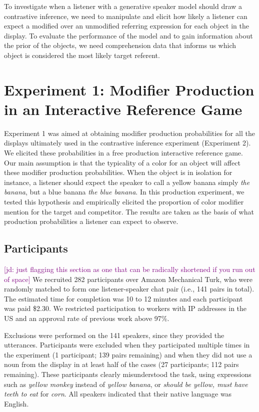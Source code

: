 \documentclass[10pt,letterpaper]{article}
\newcommand{\jd}[1]{\textcolor{Purple}{[jd: #1]}}
\begin{document}
To investigate when a listener with a generative speaker model should draw a contrastive inference, we need to manipulate and elicit how likely a listener can expect a modified over an unmodified referring expression for each object in the display. To evaluate the performance of the model and to gain information about the prior of the objects, we need comprehension data that informs us which object is considered the most likely target referent.


\section{Experiment 1: Modifier Production in an Interactive Reference Game}

Experiment 1 was aimed at obtaining modifier production probabilities for all the displays ultimately used in the contrastive inference  experiment (Experiment 2). We elicited these probabilities in a free production interactive reference game. Our main assumption is that the typicality of a color for an object will affect these modifier production probabilities. When the object is in isolation for instance, a listener should expect the speaker to call a yellow banana simply \textit{the banana}, but a blue banana \textit{the blue banana}. In this production experiment, we tested this hypothesis and empirically elicited the proportion of color modifier mention for the target and competitor. The results are taken as the basis of what production probabilities a listener can expect to observe.


\subsection{Participants}
\jd{just flagging this section as one that can be radically shortened if you run out of space}
We recruited 282 participants over Amazon Mechanical Turk, who were randomly matched to form one listener-speaker chat pair (i.e., 141 pairs in total). 
The estimated time for completion was 10 to 12 minutes and each participant was paid \$2.30. We restricted participation to workers with IP addresses in the US and an approval rate of previous work above 97\%.

Exclusions were performed on the 141 speakers, since they provided the utterances. Participants were excluded when they participated multiple times in the experiment (1 participant; 139 pairs remaining) and when they did not use a noun from the display in at least half of the cases (27 participants; 112 pairs remaining). These participants clearly misunderstood the task, using expressions such as \textit{yellow monkey} instead of \textit{yellow banana}, or \textit{should be yellow, must have teeth to eat} for \textit{corn}. All speakers indicated that their native language was English.
\end{document}
